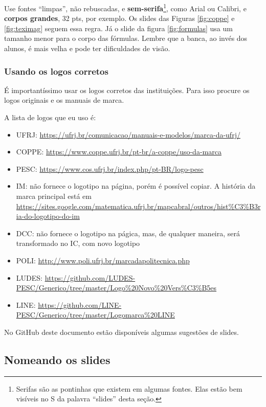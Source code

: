 Use fontes ``limpas'', não rebuscadas, e \textbf{sem-serifa}\footnote{Serifas são as pontinhas que existem em algumas fontes. Elas estão bem visíveis no S da palavra ``slides'' desta seção.}, como Arial ou Calibri, e \textbf{corpos grandes}, 32 pts, por exemplo. Os slides das Figuras \ref{fig:coppe} e \ref{fig:teximag} seguem essa regra. Já o slide da figura \ref{fig:formulas} usa um tamanho menor para o corpo das fórmulas. Lembre que a banca, ao invés dos alunos, é mais velha e pode ter dificuldades de visão.


\subsubsection{Usando os logos corretos}

É importantíssimo usar os logos corretos das instituições. Para isso procure os logos originais e os manuais de marca.

A lista de logos que eu uso é:
\begin{itemize}
    \item UFRJ: \url{https://ufrj.br/comunicacao/manuais-e-modelos/marca-da-ufrj/}
    \item COPPE: \url{https://www.coppe.ufrj.br/pt-br/a-coppe/uso-da-marca}
    \item PESC:  \url{https://www.cos.ufrj.br/index.php/pt-BR/logo-pesc}
    \item IM: não fornece o logotipo na página, porém é possível copiar. A história da marca principal está em \url{https://sites.google.com/matematica.ufrj.br/mapcabral/outros/hist%C3%B3ria-do-logotipo-do-im}
    \item DCC: não fornece o logotipo na págica, mas, de qualquer maneira, será transformado no IC, com novo logotipo
    \item POLI: \url{http://www.poli.ufrj.br/marcadapolitecnica.php}
    \item LUDES: \url{https://github.com/LUDES-PESC/Generico/tree/master/Logo%20Novo%20Vers%C3%B5es}
    \item LINE: \url{https://github.com/LINE-PESC/Generico/tree/master/Logomarca%20LINE}
\end{itemize}

No GitHub deste documento estão disponíveis algumas sugestões de slides.


\subsection{Nomeando os slides}

